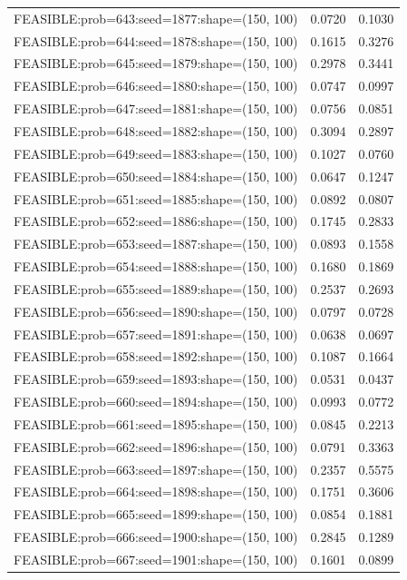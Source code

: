 \begin{longtable}{lcc}
FEASIBLE:prob=643:seed=1877:shape=(150, 100) &   0.0720 & 0.1030 \\
FEASIBLE:prob=644:seed=1878:shape=(150, 100) &   0.1615 & 0.3276 \\
FEASIBLE:prob=645:seed=1879:shape=(150, 100) &   0.2978 & 0.3441 \\
FEASIBLE:prob=646:seed=1880:shape=(150, 100) &   0.0747 & 0.0997 \\
FEASIBLE:prob=647:seed=1881:shape=(150, 100) &   0.0756 & 0.0851 \\
FEASIBLE:prob=648:seed=1882:shape=(150, 100) &   0.3094 & 0.2897 \\
FEASIBLE:prob=649:seed=1883:shape=(150, 100) &   0.1027 & 0.0760 \\
FEASIBLE:prob=650:seed=1884:shape=(150, 100) &   0.0647 & 0.1247 \\
FEASIBLE:prob=651:seed=1885:shape=(150, 100) &   0.0892 & 0.0807 \\
FEASIBLE:prob=652:seed=1886:shape=(150, 100) &   0.1745 & 0.2833 \\
FEASIBLE:prob=653:seed=1887:shape=(150, 100) &   0.0893 & 0.1558 \\
FEASIBLE:prob=654:seed=1888:shape=(150, 100) &   0.1680 & 0.1869 \\
FEASIBLE:prob=655:seed=1889:shape=(150, 100) &   0.2537 & 0.2693 \\
FEASIBLE:prob=656:seed=1890:shape=(150, 100) &   0.0797 & 0.0728 \\
FEASIBLE:prob=657:seed=1891:shape=(150, 100) &   0.0638 & 0.0697 \\
FEASIBLE:prob=658:seed=1892:shape=(150, 100) &   0.1087 & 0.1664 \\
FEASIBLE:prob=659:seed=1893:shape=(150, 100) &   0.0531 & 0.0437 \\
FEASIBLE:prob=660:seed=1894:shape=(150, 100) &   0.0993 & 0.0772 \\
FEASIBLE:prob=661:seed=1895:shape=(150, 100) &   0.0845 & 0.2213 \\
FEASIBLE:prob=662:seed=1896:shape=(150, 100) &   0.0791 & 0.3363 \\
FEASIBLE:prob=663:seed=1897:shape=(150, 100) &   0.2357 & 0.5575 \\
FEASIBLE:prob=664:seed=1898:shape=(150, 100) &   0.1751 & 0.3606 \\
FEASIBLE:prob=665:seed=1899:shape=(150, 100) &   0.0854 & 0.1881 \\
FEASIBLE:prob=666:seed=1900:shape=(150, 100) &   0.2845 & 0.1289 \\
FEASIBLE:prob=667:seed=1901:shape=(150, 100) &   0.1601 & 0.0899 \\

\end{longtable}
